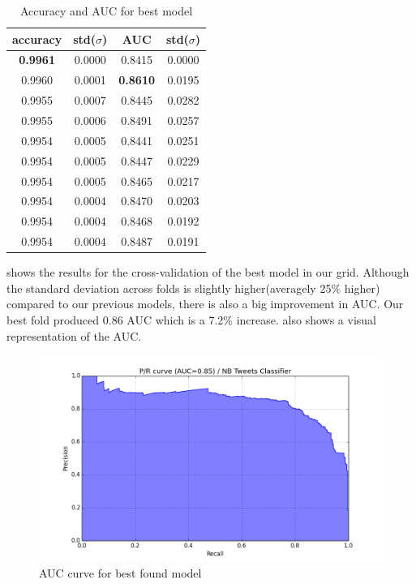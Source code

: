 \begin{table}
  \centering
  \begin{tabular}{cccc} \toprule
    accuracy        & std($\sigma$) & AUC             & std($\sigma$) \\ \midrule
    \textbf{0.9961} & 0.0000        & 0.8415          & 0.0000 \\
    0.9960          & 0.0001        & \textbf{0.8610} & 0.0195 \\
    0.9955          & 0.0007        & 0.8445          & 0.0282 \\
    0.9955          & 0.0006        & 0.8491          & 0.0257 \\
    0.9954          & 0.0005        & 0.8441          & 0.0251 \\ \midrule
    0.9954          & 0.0005        & 0.8447          & 0.0229 \\
    0.9954          & 0.0005        & 0.8465          & 0.0217 \\
    0.9954          & 0.0004        & 0.8470          & 0.0203 \\
    0.9954          & 0.0004        & 0.8468          & 0.0192 \\
    0.9954          & 0.0004        & 0.8487          & 0.0191 \\ \bottomrule
  \end{tabular}
    \caption{Accuracy and AUC for best model}
    \label{tab:best-model}
\end{table}

 shows the results for the cross-validation of the best model in our grid.
Although the standard deviation across folds is slightly higher(averagely 25\% higher) compared to
our previous models, there is also a big improvement in AUC\@. Our best fold produced 0.86 AUC which
is a 7.2\% increase.  also shows a visual representation of the AUC.


\begin{figure}
  \includegraphics[width=\linewidth]{Figures/pr_NB_Tweets_Classifier_04}
\caption{AUC curve for best found model}
\label{fig:auc-best-model}
\end{figure}

